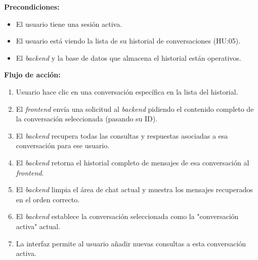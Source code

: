 \begin{addendum}
\begin{userstory}[hu:06]
{			\textbf{Precondiciones:}
			\begin{itemize}
				\item El usuario tiene una sesión activa.
				\item El usuario está viendo la lista de su historial de conversaciones (HU:05).
				\item El \textit{backend} y la base de datos que almacena el historial están operativos.
			\end{itemize}
			
			\textbf{Flujo de acción:}
			\begin{enumerate}
				\item Usuario hace clic en una conversación específica en la lista del historial.
				\item El \textit{frontend} envía una solicitud al \textit{backend} pidiendo el contenido completo de la conversación seleccionada (pasando su ID).
				\item El \textit{backend} recupera todas las consultas y respuestas asociadas a esa conversación para ese usuario.
				\item El \textit{backend} retorna el historial completo de mensajes de esa conversación al \textit{frontend}.
				\item El \textit{backend} limpia el área de chat actual y muestra los mensajes recuperados en el orden correcto.
				\item El \textit{backend} establece la conversación seleccionada como la "conversación activa" actual.
				\item La interfaz permite al usuario añadir nuevas consultas a esta conversación activa.
			\end{enumerate}
		}
		

\end{userstory}
\end{addendum}
